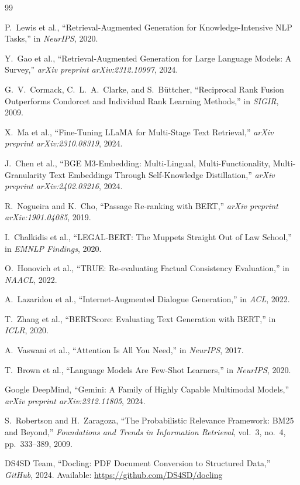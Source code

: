 \documentclass[12pt, a4paper]{article}
\begin{document}
\newpage
\begin{thebibliography}{99}

P.~Lewis et al., ``Retrieval-Augmented Generation for Knowledge-Intensive
NLP Tasks,'' in \textit{NeurIPS}, 2020.

Y.~Gao et al., ``Retrieval-Augmented Generation for Large Language Models:
A Survey,'' \textit{arXiv preprint arXiv:2312.10997}, 2024.

G.~V.~Cormack, C.~L.~A.~Clarke, and S.~B\"{u}ttcher, ``Reciprocal Rank
Fusion Outperforms Condorcet and Individual Rank Learning Methods,''
in \textit{SIGIR}, 2009.

X.~Ma et al., ``Fine-Tuning LLaMA for Multi-Stage Text Retrieval,''
\textit{arXiv preprint arXiv:2310.08319}, 2024.

J.~Chen et al., ``BGE M3-Embedding: Multi-Lingual, Multi-Functionality,
Multi-Granularity Text Embeddings Through Self-Knowledge Distillation,''
\textit{arXiv preprint arXiv:2402.03216}, 2024.

R.~Nogueira and K.~Cho, ``Passage Re-ranking with BERT,'' \textit{arXiv
preprint arXiv:1901.04085}, 2019.

I.~Chalkidis et al., ``LEGAL-BERT: The Muppets Straight Out of Law School,''
in \textit{EMNLP Findings}, 2020.

O.~Honovich et al., ``TRUE: Re-evaluating Factual Consistency Evaluation,''
in \textit{NAACL}, 2022.

A.~Lazaridou et al., ``Internet-Augmented Dialogue Generation,''
in \textit{ACL}, 2022.

T.~Zhang et al., ``BERTScore: Evaluating Text Generation with BERT,''
in \textit{ICLR}, 2020.

A.~Vaswani et al., ``Attention Is All You Need,'' in \textit{NeurIPS}, 2017.

T.~Brown et al., ``Language Models Are Few-Shot Learners,''
in \textit{NeurIPS}, 2020.

Google DeepMind, ``Gemini: A Family of Highly Capable Multimodal Models,''
\textit{arXiv preprint arXiv:2312.11805}, 2024.

S.~Robertson and H.~Zaragoza, ``The Probabilistic Relevance Framework:
BM25 and Beyond,'' \textit{Foundations and Trends in Information Retrieval},
vol.~3, no.~4, pp.~333--389, 2009.

DS4SD Team, ``Docling: PDF Document Conversion to Structured Data,''
\textit{GitHub}, 2024. Available: \url{https://github.com/DS4SD/docling}

\end{thebibliography}
\end{document}
